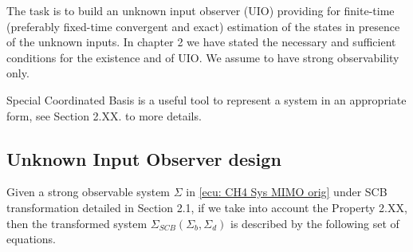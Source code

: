 \documentclass[11pt,letterpaper,twoside,openright]{report}
\newtheorem{definition}{Definition}[chapter]
\begin{document}
The task is to build an unknown input observer (UIO) providing for finite-time (preferably fixed-time convergent and exact) estimation of the states in presence of the unknown inputs. In chapter 2 we have stated the necessary and sufficient conditions for the existence and of UIO. We assume to have strong observability only.

Special Coordinated Basis is a useful tool to represent a system in an appropriate form, see Section 2.XX. to more details.

%
%
%

\subsection{Unknown Input Observer design}
Given a strong observable system $\Sigma$ in \eqref{ecu: CH4 Sys MIMO orig} under SCB transformation detailed in Section 2.1, if we take into account the Property 2.XX, then the transformed system $\Sigma_{SCB}(\Sigma_b,\Sigma_d)$ is described by the following set of equations.
\end{document}
